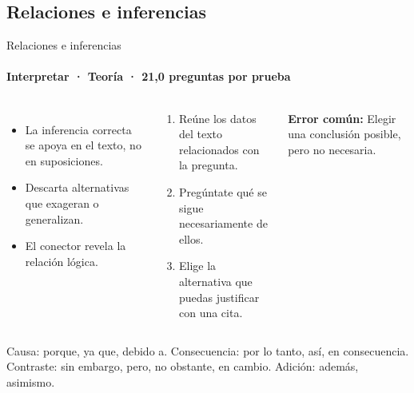 \documentclass[aspectratio=169,11pt]{beamer}
\newlength{\ajustealto}
\newenvironment{ajustar}[1][0.74\textheight]
  {\setlength{\ajustealto}{#1}\begin{lrbox}{\ajustecaja}\begin{minipage}{\textwidth}}
  {\end{minipage}\end{lrbox}%
   \ifdim\dimexpr\ht\ajustecaja+\dp\ajustecaja\relax>\ajustealto
     \resizebox*{!}{\ajustealto}{\usebox{\ajustecaja}}\else\usebox{\ajustecaja}\fi}
\begin{document}
\subsection{Relaciones e inferencias}

\begin{frame}{Relaciones e inferencias}
\label{tema-cl-inferencia}
\framesubtitle{Interpretar · Teoría · 21,0 preguntas por prueba}
\begin{ajustar}
\begin{columns}[T,onlytextwidth]
\begin{itemize}\footnotesize
\item La inferencia correcta se apoya en el texto, no en suposiciones.
\item Descarta alternativas que exageran o generalizan.
\item El conector revela la relación lógica.
\end{itemize}
\begin{cajaregla}\scriptsize \begin{enumerate}\item Reúne los datos del texto relacionados con la pregunta.\item Pregúntate qué se sigue necesariamente de ellos.\item Elige la alternativa que puedas justificar con una cita.\end{enumerate}\end{cajaregla}
\begin{notagris}\scriptsize \textbf{Error común:} Elegir una conclusión posible, pero no necesaria.\end{notagris}
\end{columns}
\begin{cajaclave}\footnotesize
Causa: porque, ya que, debido a. Consecuencia: por lo tanto, así, en consecuencia. Contraste: sin embargo, pero, no obstante, en cambio. Adición: además, asimismo.
\end{cajaclave}
\end{ajustar}
\end{frame}
\end{document}
